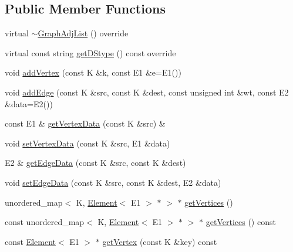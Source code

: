 \subsection*{Public Member Functions}
\begin{DoxyCompactItemize}
\item 
virtual \mbox{\hyperlink{classbridges_1_1_graph_adj_list_af7acceab0f85c75de56cf2fc74b3690b}{$\sim$\+Graph\+Adj\+List}} () override
\item 
virtual const string \mbox{\hyperlink{classbridges_1_1_graph_adj_list_ab1aeeed39ac0e0f66a677e7b0e722030}{get\+D\+Stype}} () const override
\item 
void \mbox{\hyperlink{classbridges_1_1_graph_adj_list_a55565a4aff573c6a7751d7845cdfd5f2}{add\+Vertex}} (const K \&k, const E1 \&e=E1())
\item 
void \mbox{\hyperlink{classbridges_1_1_graph_adj_list_acd9a3bf8e544a6b78e75acd6bf1d57ee}{add\+Edge}} (const K \&src, const K \&dest, const unsigned int \&wt, const E2 \&data=E2())
\item 
const E1 \& \mbox{\hyperlink{classbridges_1_1_graph_adj_list_a38ab30a0990187275d32e0590e150aaf}{get\+Vertex\+Data}} (const K \&src) \&
\item 
void \mbox{\hyperlink{classbridges_1_1_graph_adj_list_aa30a944a429e0422cbe0ddd7bdbd353b}{set\+Vertex\+Data}} (const K \&src, E1 \&data)
\item 
E2 \& \mbox{\hyperlink{classbridges_1_1_graph_adj_list_a3e4b21d0ff4b277502b2bb10e57df3c7}{get\+Edge\+Data}} (const K \&src, const K \&dest)
\item 
void \mbox{\hyperlink{classbridges_1_1_graph_adj_list_ac507940618b400d792c29b69fc9c7687}{set\+Edge\+Data}} (const K \&src, const K \&dest, E2 \&data)
\item 
unordered\+\_\+map$<$ K, \mbox{\hyperlink{classbridges_1_1_element}{Element}}$<$ E1 $>$ $\ast$ $>$ $\ast$ \mbox{\hyperlink{classbridges_1_1_graph_adj_list_a157c80e2bd439572f4f80e8850700297}{get\+Vertices}} ()
\item 
const unordered\+\_\+map$<$ K, \mbox{\hyperlink{classbridges_1_1_element}{Element}}$<$ E1 $>$ $\ast$ $>$ $\ast$ \mbox{\hyperlink{classbridges_1_1_graph_adj_list_ac33be2c332e16c0060969808eda1609b}{get\+Vertices}} () const
\item 
const \mbox{\hyperlink{classbridges_1_1_element}{Element}}$<$ E1 $>$ $\ast$ \mbox{\hyperlink{classbridges_1_1_graph_adj_list_a9a222bfc1d37f459caac60508b816fb6}{get\+Vertex}} (const K \&key) const
\item 

\end{DoxyCompactItemize}
